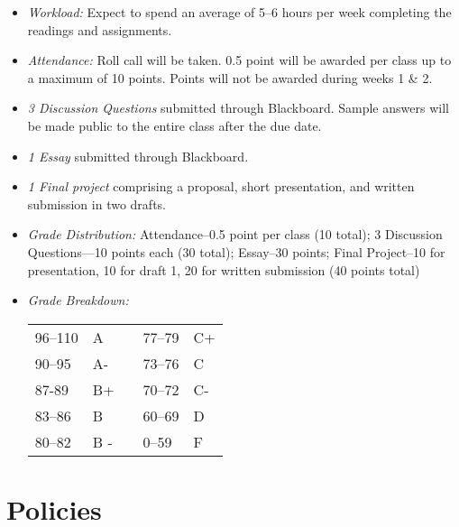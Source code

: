\documentclass[article,oneside]{memoir}
\begin{document}
\begin{itemize}
\item \textit{Workload:} Expect to spend an average of 5--6 hours per week  completing the readings and assignments.

\item \textit{Attendance:} Roll call will be taken. 0.5 point will be awarded per class up to a maximum of 10 points. Points will not be awarded during weeks 1 \& 2. 

\item \textit{3 Discussion Questions} submitted through Blackboard. Sample answers will be made public to the entire class after the due date. 

\item \textit{1 Essay} submitted through Blackboard. 
 
\item \textit{1 Final project} comprising a proposal, short presentation, and written submission in two drafts.



\item \textit{Grade Distribution:} Attendance--0.5 point per class (10 total); 3 Discussion Questions---10 points each (30 total); Essay--30 points; Final Project--10 for presentation, 10 for draft 1, 20 for written submission (40 points total)

\item \textit{Grade Breakdown:}

 \begin{tabular}{ | l | l | p{2cm} | l | l | }
    \hline 
96--110 & A  & &  77--79 &  C+ \\  
90--95 & A- & &  73--76 & C \\
87-89 & B+ &  &  70--72 & C- \\ 
83--86 & B  & &  60--69 & D\\
80--82 & B - & & 0--59 & F\\ \hline
    \end{tabular}


\end{itemize}





\section{Policies}
\end{document}
